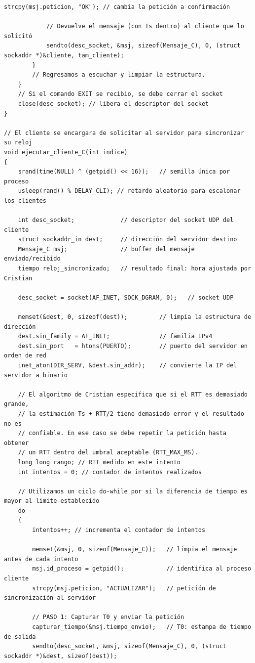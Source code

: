 \begin{lstlisting}[style=estiloC]
            strcpy(msj.peticion, "OK"); // cambia la petición a confirmación

            // Devuelve el mensaje (con Ts dentro) al cliente que lo solicitó
            sendto(desc_socket, &msj, sizeof(Mensaje_C), 0, (struct sockaddr *)&cliente, tam_cliente);
        }
        // Regresamos a escuchar y limpiar la estructura.
    }
    // Si el comando EXIT se recibio, se debe cerrar el socket
    close(desc_socket); // libera el descriptor del socket
}

// El cliente se encargara de solicitar al servidor para sincronizar su reloj
void ejecutar_cliente_C(int indice)
{
    srand(time(NULL) ^ (getpid() << 16));   // semilla única por proceso
    usleep(rand() % DELAY_CLI); // retardo aleatorio para escalonar los clientes

    int desc_socket;             // descriptor del socket UDP del cliente
    struct sockaddr_in dest;     // dirección del servidor destino
    Mensaje_C msj;               // buffer del mensaje enviado/recibido
    tiempo reloj_sincronizado;   // resultado final: hora ajustada por Cristian

    desc_socket = socket(AF_INET, SOCK_DGRAM, 0);   // socket UDP

    memset(&dest, 0, sizeof(dest));         // limpia la estructura de dirección
    dest.sin_family = AF_INET;              // familia IPv4
    dest.sin_port   = htons(PUERTO);        // puerto del servidor en orden de red
    inet_aton(DIR_SERV, &dest.sin_addr);    // convierte la IP del servidor a binario

    // El algoritmo de Cristian especifica que si el RTT es demasiado grande,
    // la estimación Ts + RTT/2 tiene demasiado error y el resultado no es
    // confiable. En ese caso se debe repetir la petición hasta obtener
    // un RTT dentro del umbral aceptable (RTT_MAX_MS).
    long long rango; // RTT medido en este intento
    int intentos = 0; // contador de intentos realizados

    // Utilizamos un ciclo do-while por si la diferencia de tiempo es mayor al limite establecido
    do
    {
        intentos++; // incrementa el contador de intentos

        memset(&msj, 0, sizeof(Mensaje_C));   // limpia el mensaje antes de cada intento
        msj.id_proceso = getpid();            // identifica al proceso cliente
        strcpy(msj.peticion, "ACTUALIZAR");   // petición de sincronización al servidor

        // PASO 1: Capturar T0 y enviar la petición
        capturar_tiempo(&msj.tiempo_envio);   // T0: estampa de tiempo de salida
        sendto(desc_socket, &msj, sizeof(Mensaje_C), 0, (struct sockaddr *)&dest, sizeof(dest));


\end{lstlisting}
